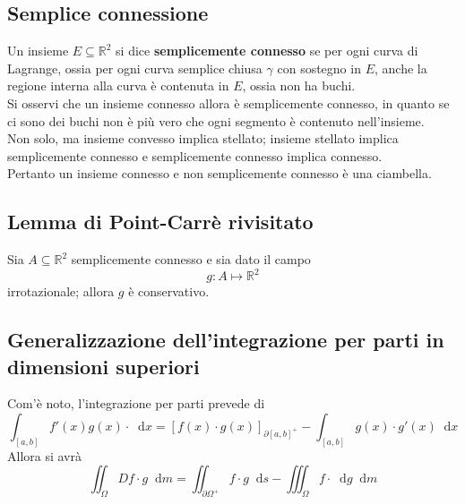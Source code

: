 \documentclass[a4paper]{extarticle}
\newcommand*\dif{\mathop{}\!\mathrm{d}}
\begin{document}
\vspace{1em}
\noindent
\subsection{Semplice connessione}
Un insieme $E \subseteq \mathbb{R}^2$ si dice \textbf{semplicemente connesso} se per ogni curva di Lagrange, ossia per ogni curva semplice chiusa $\gamma$ con sostegno in $E$, anche la regione interna alla curva è contenuta in $E$, ossia non ha buchi.\\
Si osservi che un insieme connesso allora è semplicemente connesso, in quanto se ci sono dei buchi non è più vero che ogni segmento è contenuto nell'insieme.\\
Non solo, ma insieme convesso implica stellato; insieme stellato implica semplicemente connesso e semplicemente connesso implica connesso.\\
Pertanto un insieme connesso e non semplicemente connesso è una ciambella.

\vspace{1em}
\subsection{Lemma di Point-Carrè rivisitato}
Sia $A \subseteq \mathbb{R}^2$ semplicemente connesso e sia dato il campo
\[g : A \longmapsto \mathbb{R}^2\]
irrotazionale; allora $g$ è conservativo.

\vspace{1em}
\subsection{Generalizzazione dell'integrazione per parti in dimensioni superiori}
Com'è noto, l'integrazione per parti prevede di
\[\int_[a,b] f'(x) g(x) \cdot \dif x = \left[f(x) \cdot g(x)\right]_{\partial [a,b]^+} - \int_{[a,b]} g(x) \cdot g'(x) \dif x\]
Allora si avrà
\[\iint_{\Omega} Df \cdot g \dif m = \iint_{\partial  \Omega^+} f \cdot g \dif s - \iiint_\Omega f \cdot \dif g \dif m\]
\end{document}

